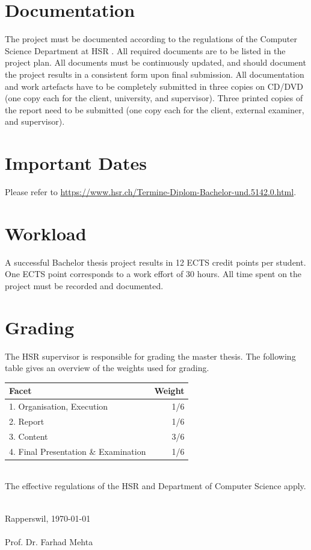 \documentclass[a4paper]{article}
\begin{document}
\section{Documentation}
The project must be documented according to the regulations of the Computer
Science Department at
HSR \cite{hsr:general}. All
required documents are to be listed in the project plan. All documents must be
continuously updated, and should document the project results in a consistent
form upon final submission. All documentation and work artefacts have to be
completely submitted in three copies on CD/DVD (one copy each for the client,
university, and supervisor). Three printed copies of the report need to be
submitted (one copy each for the client, external examiner, and supervisor).

\section{Important Dates}
Please refer to \url{https://www.hsr.ch/Termine-Diplom-Bachelor-und.5142.0.html}.

\section{Workload}
A successful Bachelor thesis project results in 12 ECTS credit points per
student. One ECTS point corresponds to a work effort of 30 hours.
All time spent on the project must be recorded and documented.

\section{Grading}
The HSR supervisor is responsible for grading the master thesis. The following
table gives an overview of the weights used for grading.\\


\begin{center}
\noindent
\begin{tabulary}{1.0\textwidth}{| L | R |}
	\hline
	Facet & Weight \\ . Organisation, Execution	& 1/6 \\
	2. Report	& 1/6 \\
	3. Content	& 3/6 \\
	4. Final Presentation \& Examination & 1/6 \\
	\hline
\end{tabulary}
\end{center}

\noindent
\\
The effective regulations of the HSR and Department of Computer
Science \cite{hsr:rules}
apply.

\noindent
\vspace{2cm}\\
Rapperswil, \today\\
\vspace{1.5cm}\\
\noindent
Prof. Dr. Farhad Mehta

\clearpage
\printbibliography
\end{document}
